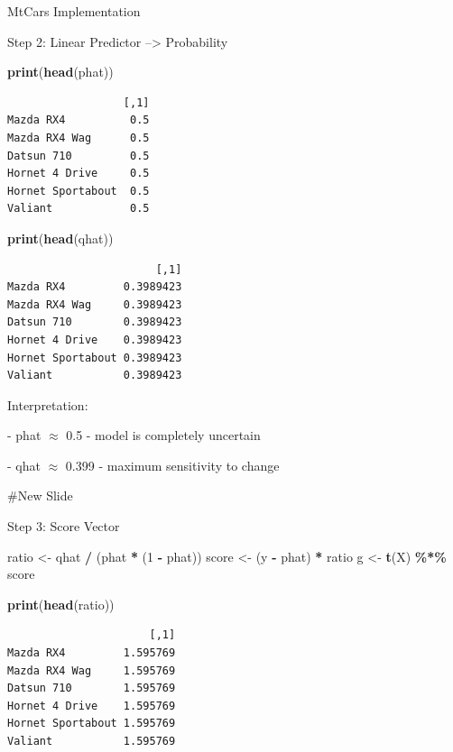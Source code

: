 \documentclass[
  ignorenonframetext,
]{beamer}
\newenvironment{Shaded}{\begin{snugshade}}{\end{snugshade}}
\newcommand{\DecValTok}[1]{\textcolor[rgb]{0.00,0.00,0.81}{#1}}
\newcommand{\FunctionTok}[1]{\textcolor[rgb]{0.13,0.29,0.53}{\textbf{#1}}}
\newcommand{\NormalTok}[1]{#1}
\newcommand{\OtherTok}[1]{\textcolor[rgb]{0.56,0.35,0.01}{#1}}
\newcommand{\SpecialCharTok}[1]{\textcolor[rgb]{0.81,0.36,0.00}{\textbf{#1}}}
\begin{document}
\begin{frame}[fragile]{MtCars Implementation}
\begin{block}{Step 2: Linear Predictor --\textgreater{} Probability}
\begin{Shaded}
\begin{Highlighting}[]
\FunctionTok{print}\NormalTok{(}\FunctionTok{head}\NormalTok{(phat))}
\end{Highlighting}
\end{Shaded}

\begin{verbatim}
                  [,1]
Mazda RX4          0.5
Mazda RX4 Wag      0.5
Datsun 710         0.5
Hornet 4 Drive     0.5
Hornet Sportabout  0.5
Valiant            0.5
\end{verbatim}

\begin{Shaded}
\begin{Highlighting}[]
\FunctionTok{print}\NormalTok{(}\FunctionTok{head}\NormalTok{(qhat))}
\end{Highlighting}
\end{Shaded}

\begin{verbatim}
                       [,1]
Mazda RX4         0.3989423
Mazda RX4 Wag     0.3989423
Datsun 710        0.3989423
Hornet 4 Drive    0.3989423
Hornet Sportabout 0.3989423
Valiant           0.3989423
\end{verbatim}

Interpretation:

- phat \(\approx\) 0.5 - model is completely uncertain

- qhat \(\approx\) 0.399 - maximum sensitivity to change

\#New Slide
\end{block}

\begin{block}{Step 3: Score Vector}
\protect{}\label{step-3-score-vector-1}
\begin{Shaded}
\begin{Highlighting}[]
\NormalTok{ratio }\OtherTok{\textless{}{-}}\NormalTok{ qhat }\SpecialCharTok{/}\NormalTok{ (phat }\SpecialCharTok{*}\NormalTok{ (}\DecValTok{1} \SpecialCharTok{{-}}\NormalTok{ phat))}
\NormalTok{score }\OtherTok{\textless{}{-}}\NormalTok{ (y }\SpecialCharTok{{-}}\NormalTok{ phat) }\SpecialCharTok{*}\NormalTok{ ratio}
\NormalTok{g     }\OtherTok{\textless{}{-}} \FunctionTok{t}\NormalTok{(X) }\SpecialCharTok{\%*\%}\NormalTok{ score}

\FunctionTok{print}\NormalTok{(}\FunctionTok{head}\NormalTok{(ratio))}
\end{Highlighting}
\end{Shaded}

\begin{verbatim}
                      [,1]
Mazda RX4         1.595769
Mazda RX4 Wag     1.595769
Datsun 710        1.595769
Hornet 4 Drive    1.595769
Hornet Sportabout 1.595769
Valiant           1.595769
\end{verbatim}


\end{block}
\end{frame}
\end{document}
